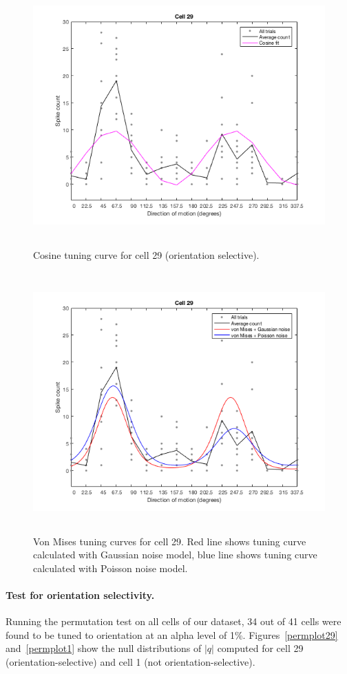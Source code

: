 \documentclass[10pt]{article}
\begin{document}
\begin{figure}[!h]
\centering
\includegraphics[height=10cm]{fitCos.png}
\caption{Cosine tuning curve for cell 29 (orientation selective).
\label{fitCos29}}
\end{figure}

\begin{figure}[!h]
\centering
\includegraphics[height=10cm]{fitVonMises.png}
\caption{Von Mises tuning curves for cell 29. Red line shows tuning curve calculated with Gaussian noise model, blue line shows tuning curve calculated with Poisson noise model.
\label{fitVonMises}}
\end{figure}

\paragraph{Test for orientation selectivity.} Running the permutation test on all cells of our dataset, 34 out of 41 cells were found to be tuned to orientation at an alpha level of 1\%. Figures~\ref{permplot29} and~\ref{permplot1} show the null distributions of $|q|$ computed for cell 29 (orientation-selective) and cell 1 (not orientation-selective).
\end{document}

